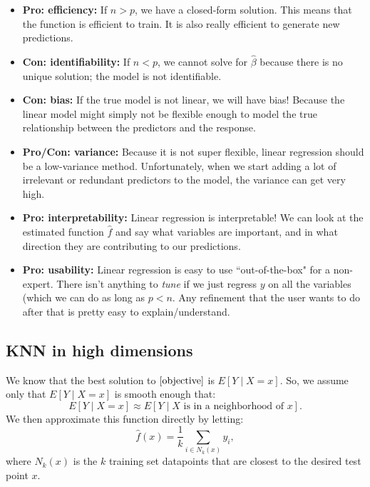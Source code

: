 \begin{itemize}
\item \textbf{Pro: efficiency: } If $n > p$, we have a closed-form solution. This means that the function is efficient to train. It is also really efficient to generate new predictions. 
\item \textbf{Con: identifiability: } If $n < p$, we cannot solve for $\hat{\beta}$ because there is no unique solution; the model is not identifiable. 
\item \textbf{Con: bias: } If the true model is not linear, we will have bias! Because the linear model might simply not be flexible enough to model the true relationship between the predictors and the response.
\item \textbf{Pro/Con: variance: } Because it is not super flexible, linear regression should be a low-variance method. Unfortunately, when we start adding a lot of irrelevant or redundant predictors to the model, the variance can get very high. 
\item \textbf{Pro: interpretability: } Linear regression is interpretable! We can look at the estimated function $\hat{f}$ and say what variables are important, and in what direction they are contributing to our predictions. 
\item \textbf{Pro: usability: } Linear regression is easy to use ``out-of-the-box" for a non-expert. There isn't anything to \emph{tune} if we just regress $y$ on all the variables (which we can do as long as $p < n$. Any refinement that the user wants to do after that is pretty easy to explain/understand.  
\end{itemize}

\subsection{KNN in high dimensions}

We know that the best solution to $\eqref{objective}$ is $E[Y \mid X=x]$. So, we assume only that $E[Y \mid X=x]$ is smooth enough that:
$$
E[Y \mid X=x] \approx E[Y \mid X \text{ is in a neighborhood of } x].
$$
We then approximate this function directly by letting:
$$
\hat{f}(x) = \frac{1}{k} \sum_{i \in N_k(x)} y_i,
$$
where $N_k(x)$ is the $k$ training set datapoints that are closest to the desired test point $x$. 


